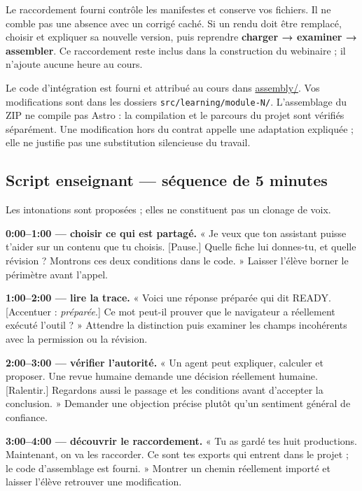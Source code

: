 \documentclass[
  canadien,
  11pt,
  a4paper,
]{report}
\begin{document}
Le raccordement fourni contrôle les manifestes et conserve vos fichiers.
Il ne comble pas une absence avec un corrigé caché. Si un rendu doit
être remplacé, choisir et expliquer sa nouvelle version, puis reprendre
\textbf{charger → examiner → assembler}. Ce raccordement reste inclus
dans la construction du webinaire ; il n'ajoute aucune heure au cours.

Le code d'intégration est fourni et attribué au cours dans
\href{../../assembly/README.md}{assembly/}. Vos modifications sont dans
les dossiers \texttt{src/\allowbreak{}learning/\allowbreak{}module-N/\allowbreak{}}. L'assemblage du ZIP ne
compile pas Astro : la compilation et le parcours du projet sont
vérifiés séparément. Une modification hors du contrat appelle une
adaptation expliquée ; elle ne justifie pas une substitution silencieuse
du travail.

\subsection{Script enseignant --- séquence de 5
minutes}\label{script-enseignant-suxe9quence-de-5-minutes-7}

Les intonations sont proposées ; elles ne constituent pas un clonage de
voix.

\textbf{0:00--1:00 --- choisir ce qui est partagé.} « Je veux que ton
assistant puisse t'aider sur un contenu que tu choisis. {[}Pause.{]}
Quelle fiche lui donnes-tu, et quelle révision ? Montrons ces deux
conditions dans le code. » Laisser l'élève borner le périmètre avant
l'appel.

\textbf{1:00--2:00 --- lire la trace.} « Voici une réponse préparée qui
dit READY. {[}Accentuer : \emph{préparée}.{]} Ce mot peut-il prouver que
le navigateur a réellement exécuté l'outil ? » Attendre la distinction
puis examiner les champs incohérents avec la permission ou la révision.

\textbf{2:00--3:00 --- vérifier l'autorité.} « Un agent peut expliquer,
calculer et proposer. Une revue humaine demande une décision réellement
humaine. {[}Ralentir.{]} Regardons aussi le passage et les conditions
avant d'accepter la conclusion. » Demander une objection précise plutôt
qu'un sentiment général de confiance.

\textbf{3:00--4:00 --- découvrir le raccordement.} « Tu as gardé tes
huit productions. Maintenant, on va les raccorder. Ce sont tes exports
qui entrent dans le projet ; le code d'assemblage est fourni. » Montrer
un chemin réellement importé et laisser l'élève retrouver une
modification.
\end{document}

